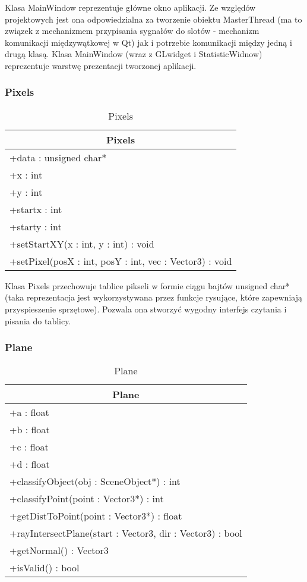 Klasa MainWindow reprezentuje główne okno aplikacji. Ze względów projektowych jest ona odpowiedzialna za tworzenie obiektu MasterThread (ma to związek z mechanizmem przypisania sygnałów do slotów - mechanizm komunikacji międzywątkowej w Qt) jak i potrzebie komunikacji między jedną i drugą klasą. Klasa MainWindow (wraz z GLwidget i StatisticWidnow) reprezentuje warstwę prezentacji tworzonej aplikacji.


\subsubsection{Pixels}

\footnotesize
\begin{longtable}{|p{14cm}|}
    \caption{Pixels} \label{tab:Pixels} \\ \hline
    \multicolumn{1}{|c|}{Pixels} \\ \hline
    +data : unsigned char* \\
    +x : int \\
    +y : int \\ 
    +startx : int \\
    +starty : int \\
    \hline
	+setStartXY(x : int, y : int) : void \\
	+setPixel(posX : int, posY : int, vec : Vector3) : void \\
	\hline
\end{longtable}
\normalsize

Klasa Pixels przechowuje tablice pikseli w formie ciągu bajtów unsigned char* (taka reprezentacja jest wykorzystywana przez funkcje rysujące, które zapewniają przyspieszenie sprzętowe). Pozwala ona stworzyć wygodny interfejs czytania i pisania do tablicy. 

\newpage
\subsubsection{Plane}

\footnotesize
\begin{longtable}{|p{14cm}|}
    \caption{Plane} \label{tab:Plane} \\ \hline
    \multicolumn{1}{|c|}{Plane} \\ \hline
    +a : float \\ 
    +b : float \\
    +c : float \\
    +d : float \\
    \hline
	+classifyObject(obj : SceneObject*) : int \\
	+classifyPoint(point : Vector3*) : int \\
	+getDistToPoint(point : Vector3*) : float \\
	+rayIntersectPlane(start : Vector3, dir : Vector3) : bool \\
	+getNormal() : Vector3 \\
	+isValid() : bool \\
	\hline
\end{longtable}
\normalsize

